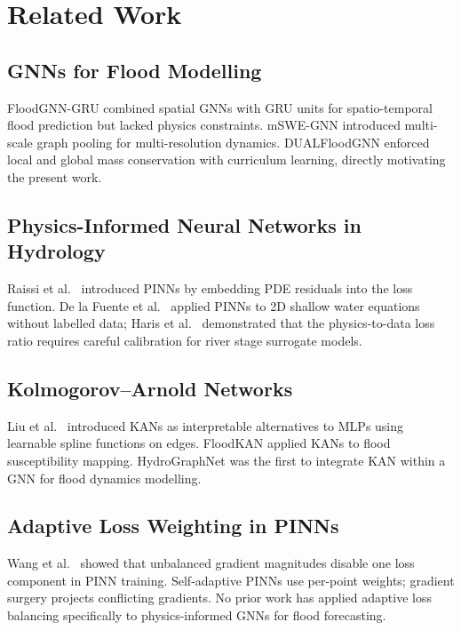 \documentclass[conference]{IEEEtran}
\begin{document}
\section{Related Work}
\label{sec:related}

\subsection{GNNs for Flood Modelling}
FloodGNN-GRU \cite{bentivoglio2023} combined spatial GNNs with GRU units
for spatio-temporal flood prediction but lacked physics constraints.
mSWE-GNN \cite{lino2025} introduced multi-scale graph pooling for
multi-resolution dynamics. DUALFloodGNN \cite{acosta2025} enforced local
and global mass conservation with curriculum learning, directly motivating
the present work.

\subsection{Physics-Informed Neural Networks in Hydrology}
Raissi et al.\ \cite{raissi2019} introduced PINNs by embedding PDE
residuals into the loss function. De la Fuente et al.\ \cite{delaFuente2023}
applied PINNs to 2D shallow water equations without labelled data; Haris et
al.\ \cite{haris2025} demonstrated that the physics-to-data loss ratio
requires careful calibration for river stage surrogate models.

\subsection{Kolmogorov--Arnold Networks}
Liu et al.\ \cite{liu2024kan} introduced KANs as interpretable
alternatives to MLPs using learnable spline functions on edges. FloodKAN
\cite{zhao2025} applied KANs to flood susceptibility mapping. HydroGraphNet
was the first to integrate KAN within a GNN for flood dynamics modelling.

\subsection{Adaptive Loss Weighting in PINNs}
Wang et al.\ \cite{wang2021} showed that unbalanced gradient magnitudes
disable one loss component in PINN training. Self-adaptive PINNs
\cite{mcclenny2023} use per-point weights; gradient surgery \cite{yu2020}
projects conflicting gradients. No prior work has applied adaptive loss
balancing specifically to physics-informed GNNs for flood forecasting.
\end{document}
